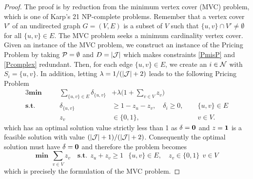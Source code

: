 \documentclass[twoside,11pt]{article}
\begin{document}
\begin{proof}
The proof is by reduction from the minimum vertex cover (MVC) problem, which is  one of Karp's 21 NP-complete problems. Remember that a vertex cover $V'$  of an undirected graph $G = ( V , E )$  is a subset of $V$  such that $\{u,v\}\cap V'\not=\emptyset$ for all $\{u,v\} \in E$. The MVC problem seeks a minimum cardinality vertex cover. Given an instance of the MVC problem, we construct an instance of the Pricing Problem by taking ${\cal P}=\emptyset$ and $D=\lvert{\cal J}\rvert$ which makes constraints \eqref{PmisP} and \eqref{Pcomplex} redundant.
	Then, for each edge  $\{u,v\} \in E$, we create an $i\in{\cal N}$ with $S_i= \{u,v\}$.
	In addition, letting $\lambda=1/(\lvert{\cal J}\rvert+2)$ leads to the following Pricing Problem 
\begin{alignat*}{3}
\textbf{min} &\quad&\sum_{\{u,v\}\in E}  \delta_{\{u,v\}}  &+ \lambda\Biggl(1 + \sum_{v\in V} z_v\Biggr)&\\
\textbf{s.t.}  
&& \delta_{\{u,v\}} &\geq 1- z_u-z_v, \quad \delta_i \geq 0,\quad \; &\{u,v\}\in E\\
&&z_v  &\in\{0,1\},  &{v \in V} .\end{alignat*}
	which has an optimal solution value strictly less than 1 as $\delta = \bf0$ and $z=\bf1$ is a feasible solution with value $(\lvert{\cal J}\rvert+1)/(\lvert{\cal J}\rvert+2)$.
	Consequently the optimal solution must have  $\delta = \bf0$ and therefore the problem becomes 
$$\textbf{min} ~~ \sum_{v\in V} z_v \quad \textbf{s.t.}~~  z_u+z_v \geq 1~~ \; \{u,v\}\in E,\quad z_v  \in\{0,1\}~~ {v \in V} $$
which is precisely the formulation of the MVC problem.
		\end{proof}

\end{document}
